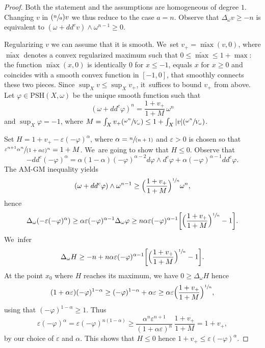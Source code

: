 \documentclass[10pt]{amsart}
\newcommand{\Psfrac}[2]{(\sfrac{#1}{#2})}
\newcommand{\spfrac}[2]{\sfrac{#1}{(#2)}}
\theoremstyle{definition}
\let\e\varepsilon
\let\f\varphi
\newcommand \PSH {\mathrm{PSH}}
\begin{document}
\begin{proof}
Both the statement and the assumptions are homogeneous of degree $1$.
Changing $v$ in $\Psfrac{n}{a} v$ we thus reduce to the case $a=n$.
Observe that $\Delta_{\omega} v \geq -n$ is equivalent to $(\omega+dd^c v) \wedge \omega^{n-1} \geq 0$.

Regularizing $v$ we can assume that it is smooth. We~set $v_+=\widetilde{\max}(v,0)$, where
$\widetilde{\max}$ denotes a convex regularized maximum such that $0\leq \widetilde{\max} \leq 1+ \max$:
the function $\widetilde{\max}(x,0)$ is identically $0$ for $x \leq -1$, equals $x$ for $x \geq 0$ and
coincides with a smooth convex function in $[-1,0]$, that smoothly connects these two pieces.
Since $\sup_X v \leq \sup_X v_+$, it~suffices to bound $v_+$ from above.
Let $\f \in\PSH(X,\omega)$ be the unique smooth function such that\vspace*{-3pt}
\[
(\omega+dd^c \f)^n=\frac{1+v_+}{1+M}\, \omega^n
\]
and $\sup_X \f=-1$, where
$M=\int_X v_+ \Psfrac{\omega^n}{V_\omega} \leq 1+ \int_X |v| \Psfrac{\omega^n}{V_\omega}$.

Set $H=1+v_+-\e (-\f)^{\alpha}$, where $\alpha=\spfrac{n}{n+1}$ and
$\e>0$ is chosen so that $\sfrac{\e^{n+1}\alpha^n}{(1+\alpha \e)^n}=1+M$. We~are going to show that $H \leq 0$.
Observe that
\[
-dd^c (-\f)^{\alpha}=\alpha(1-\alpha) (-\f)^{\alpha-2} d\f \wedge d^c \f +\alpha(-\f)^{\alpha-1} dd^c \f.
\]
The AM-GM inequality yields\vspace*{-3pt}
\[
(\omega+dd^c \f) \wedge \omega^{n-1} \geq \Bigl(\frac{1+v_+}{1+M} \Bigr)^{\sfrac{1}{n}} \omega^n,
\]
hence\vspace*{-3pt}
\[
\Delta_{\omega}(-\e (-\f)^{\alpha}) \geq \alpha \e(-\f)^{\alpha-1} \Delta_{\omega} \f
\geq n \alpha \e(-\f)^{\alpha-1} \biggl[ \Bigl(\frac{1+v_+}{1+M} \Bigr)^{\sfrac{1}{n}} -1 \biggr].
\]
We~infer
\[
\Delta_{\omega}H \geq -n+n \alpha \e(-\f)^{\alpha-1} \biggl[ \Bigl(\frac{1+v_+}{1+M} \Bigr)^{\sfrac{1}{n}} -1 \biggr].
\]
At the point $x_0$ where $H$ reaches its maximum, we have $0 \geq \Delta_{\omega}H $ hence
\[
(1+\alpha \e)(-\f)^{1-\alpha} \geq (-\f)^{1-\alpha}+\alpha \e \geq
\alpha \e \Bigl(\frac{1+v_+}{1+M} \Bigr)^{\sfrac{1}{n}},
\]
using that $(-\f)^{1-\alpha} \geq 1$. Thus
\[
\e (-\f)^{\alpha}=\e (-\f)^{n(1-\alpha)} \geq \frac{\alpha^n \e^{n+1}}{(1+\alpha \e)^n}\, \frac{1+v_+}{1+M}=1+v_+,
\]
by our choice of $\e$ and $\alpha$. This shows that $H \leq 0$
hence $1+v_+ \leq \e (-\f)^{\alpha}$.


\end{proof}
\end{document}

